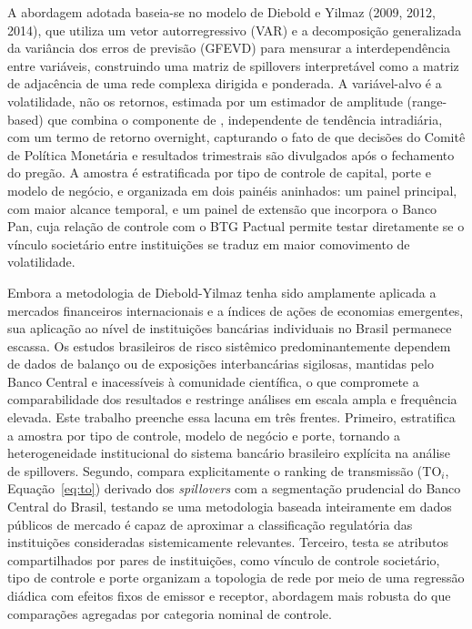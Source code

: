\documentclass[12pt, a4paper, oneside, english, brazil]{abntex2}
\begin{document}
A abordagem adotada baseia-se no modelo de Diebold e Yilmaz (2009, 2012, 2014), que utiliza um 
vetor autorregressivo (VAR) e a decomposição generalizada da variância dos erros de previsão 
(GFEVD) para mensurar a interdependência entre variáveis, construindo uma matriz de spillovers 
interpretável como a matriz de adjacência de uma rede complexa dirigida e ponderada. A variável-alvo é a 
volatilidade, não os retornos, estimada por um estimador de amplitude (range-based) que combina 
o componente de \textcite{rogers1991}, independente de tendência intradiária, com um termo 
de retorno overnight, capturando o fato de que decisões do Comitê de Política Monetária e 
resultados trimestrais são divulgados após o fechamento do pregão. A amostra é estratificada 
por tipo de controle de capital, porte e modelo de negócio, e organizada em dois painéis 
aninhados: um painel principal, com maior alcance temporal, e um painel de extensão que 
incorpora o Banco Pan, cuja relação de controle com o BTG Pactual permite testar diretamente 
se o vínculo societário entre instituições se traduz em maior comovimento de volatilidade.

Embora a metodologia de Diebold-Yilmaz tenha sido amplamente aplicada a mercados financeiros 
internacionais e a índices de ações de economias emergentes, sua aplicação ao nível de 
instituições bancárias individuais no Brasil permanece escassa. Os estudos brasileiros de risco 
sistêmico predominantemente dependem de dados de balanço ou de exposições interbancárias 
sigilosas, mantidas pelo Banco Central e inacessíveis à comunidade científica, o que compromete 
a comparabilidade dos resultados e restringe análises em escala ampla e frequência elevada. 
Este trabalho preenche essa lacuna em três frentes. Primeiro, estratifica a amostra por tipo de 
controle, modelo de negócio e porte, tornando a heterogeneidade institucional do sistema 
bancário brasileiro explícita na análise de spillovers. Segundo, compara explicitamente o ranking de 
transmissão (TO$_i$, Equação~\ref{eq:to}) derivado dos \textit{spillovers} com a
segmentação prudencial do Banco Central do Brasil, testando se uma
metodologia baseada inteiramente em dados públicos de mercado é capaz de
aproximar a classificação regulatória das instituições consideradas
sistemicamente relevantes.
Terceiro, testa se atributos compartilhados por pares de instituições, como vínculo de controle societário,
tipo de controle e porte organizam a topologia de rede por meio de uma regressão diádica com efeitos
fixos de emissor e receptor, abordagem mais robusta do que comparações agregadas por categoria nominal
de controle.
\end{document}
